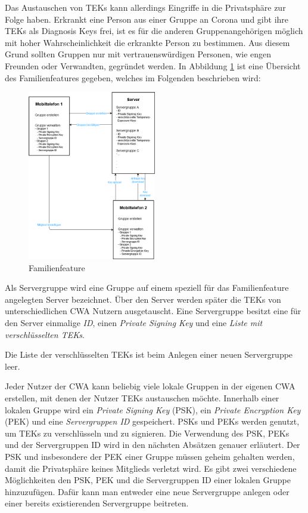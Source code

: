 \documentclass[conference,compsoc]{IEEEtran}
\begin{document}
Das Austauschen von TEKs kann allerdings Eingriffe in die Privatsphäre zur Folge haben.
Erkrankt eine Person aus einer Gruppe an Corona und gibt ihre TEKs als Diagnosis Keys frei, ist es für die anderen Gruppenangehörigen möglich mit hoher Wahrscheinlichkeit die erkrankte Person zu bestimmen.
Aus diesem Grund sollten Gruppen nur mit vertrauenswürdigen Personen, wie engen Freunden oder Verwandten, gegründet werden.
In Abbildung \ref{Familienfeature_Abbildung} ist eine Übersicht des Familienfeatures gegeben, welches im Folgenden beschrieben wird:

\begin{figure}[h]
	\centering
	\includegraphics[width=0.5\textwidth]{"Familiengruppe"}
	\caption{Familienfeature}
	\label{Familienfeature_Abbildung}
\end{figure}

Als Servergruppe wird eine Gruppe auf einem speziell für das Familienfeature angelegten Server bezeichnet.
Über den Server werden später die TEKs von unterschiedlichen CWA Nutzern ausgetauscht.
Eine Servergruppe besitzt eine für den Server einmalige \textit{ID}, einen \textit{Private Signing Key } und eine \textit{Liste mit verschlüsselten TEKs}.

Die Liste der verschlüsselten TEKs ist beim Anlegen einer neuen Servergruppe leer.

Jeder Nutzer der CWA kann beliebig viele lokale Gruppen in der eigenen CWA erstellen, mit denen der Nutzer TEKs austauschen möchte.
Innerhalb einer lokalen Gruppe wird ein \textit{Private Signing Key} (PSK), ein \textit{Private Encryption Key} (PEK) und eine \textit{Servergruppen ID} gespeichert.
PSKs und PEKs werden genutzt, um TEKs zu verschlüsseln und zu signieren.
Die Verwendung des PSK, PEKs und der Servergruppen ID wird in den nächsten Absätzen genauer erläutert.
Der PSK und insbesondere der PEK einer Gruppe müssen geheim gehalten werden, damit die Privatsphäre keines Mitglieds verletzt wird.
Es gibt zwei verschiedene Möglichkeiten den PSK, PEK und die Servergruppen ID einer lokalen Gruppe hinzuzufügen.
Dafür kann man entweder eine neue Servergruppe anlegen oder einer bereits existierenden Servergruppe beitreten.
\end{document}
